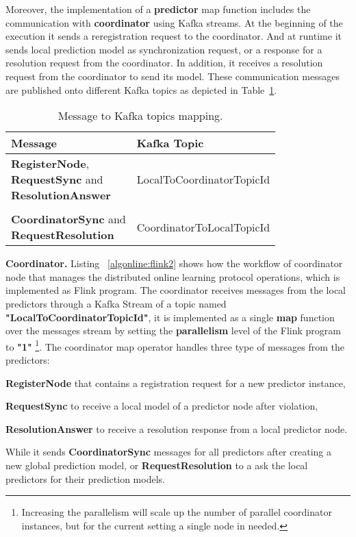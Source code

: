 \par Moreover, the implementation of  a \textbf{predictor} map function includes the communication  with \textbf{coordinator} using Kafka streams. At the beginning of the execution it sends a reregistration request to the coordinator. And at runtime it sends  local prediction model as synchronization request,  or  a response for a resolution request from the coordinator. In addition, it receives a resolution request from the coordinator to send its model. These communication messages are published onto different  Kafka topics as depicted in Table~\ref{tab:messagesToTopics}. 

\begin{table}[h]
	\caption{Message to Kafka topics mapping.}
	\label{tab:messagesToTopics}
	\begin{tabular}{p{3cm}l}
		\toprule
		Message &Kafka Topic\\
		\midrule
		\parbox[t]{4cm}{\textbf{RegisterNode}, \\ \textbf{RequestSync} and \\\textbf{ResolutionAnswer} } &LocalToCoordinatorTopicId\\ \\
		
			  \parbox[t]{4cm}{\textbf{CoordinatorSync} and \\ \textbf{RequestResolution}} &CoordinatorToLocalTopicId\\
		
		\bottomrule
	\end{tabular}
\end{table}


\textbf{Coordinator.} Listing ~\ref{algonline:flink2} shows how the workflow of coordinator node that manages the distributed online learning protocol operations, which is implemented as Flink program. The coordinator receives messages from the local predictors through a Kafka Stream of a topic named \textbf{"LocalToCoordinatorTopicId"}, it is implemented as a single \textbf{map} function over the messages stream by setting the \textbf{parallelism} level of the Flink program to \textbf{"1"} \footnote{Increasing the parallelism will scale up the number of parallel coordinator instances, but for the current setting a single node in needed.}. The coordinator map operator handles three type of messages from the predictors: \begin{enumerate*}[(i)]
	\item \textbf{RegisterNode} that contains  a registration request for a new predictor instance,
	\item \textbf{RequestSync} to receive a local model of a predictor node after violation,
	\item \textbf{ResolutionAnswer} to receive a resolution response from  a local predictor node.  
\end{enumerate*}  
 While it sends \textbf{CoordinatorSync} messages for all predictors after creating a new global prediction model, or \textbf{RequestResolution} to a ask the local predictors for their prediction models.
 

